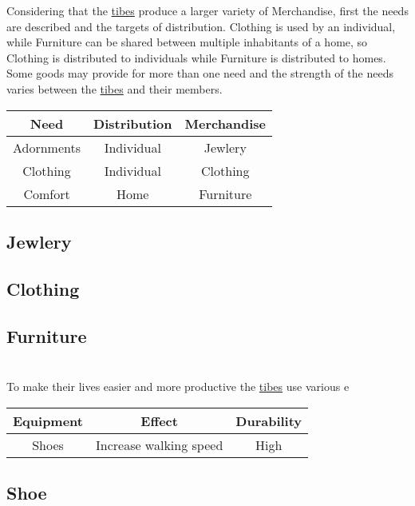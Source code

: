 Considering that the \hyperref[ch:Tribes]{tibes} produce a larger variety of
\gls*{Merchandise}, first the needs are described and the targets of
distribution. \Gls{Clothing} is used by an individual, while \gls{Furniture}
can be shared between multiple inhabitants of a home, so \Gls{Clothing} is
distributed to individuals while \gls{Furniture} is distributed to homes. Some
goods may provide for more than one need and the strength of the needs varies
between the \hyperref[ch:Tribes]{tibes} and their members.

\begin{longtable}{ccc}
	\toprule
	Need       & Distribution & \Gls*{Merchandise} \\
	\midrule
	Adornments & Individual   & \Gls{Jewlery}      \\
	Clothing   & Individual   & \Gls{Clothing}     \\
	Comfort    & Home         & \Gls{Furniture}    \\
	\bottomrule
\end{longtable}

\subsection{\Gls*{Jewlery}}

\subsection{\Gls*{Clothing}}

\subsection{\Gls*{Furniture}}

\section{}\label{ch:Goods:Equipment}
To make their lives easier and more productive the \hyperref[ch:Tribes]{tibes} use various e

\begin{longtable}{ccc}
	\toprule
	\Gls*{Equipment} & Effect                 & Durability \\
	\midrule
	\Glspl{Shoe}     & Increase walking speed & High       \\
	\bottomrule
\end{longtable}

\subsection{\Gls*{Shoe}}

